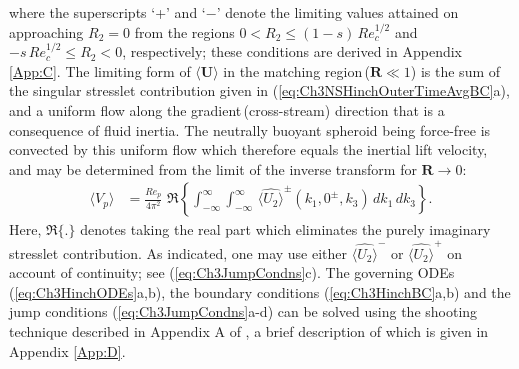 \documentclass{jfm}
\begin{document}
where the superscripts `+' and `$-$' denote the limiting values attained on approaching $R_2 = 0$ from the regions $0<R_2\leq(1-s)\,Re_c^{1/2}$ and $-s\,Re_c^{1/2}\leq R_2<0$, respectively; these conditions are derived in Appendix \ref{App:C}. The limiting form of $\langle \bm{U} \rangle$ in the matching region\,($\bm{R}\ll 1$) is the sum of the singular stresslet contribution given in (\ref{eq:Ch3NSHinchOuterTimeAvgBC}a), and a uniform flow along the gradient\,(cross-stream) direction that is a consequence of fluid inertia. The neutrally buoyant spheroid being force-free is convected by this uniform flow which therefore equals the inertial lift velocity, and may be determined from the limit of the inverse transform for $\bm{R}\to0$:
\begin{align}
\langle V_p\rangle&=\frac{Re_p}{4\pi^2}\,\,\Re\left\{\int_{-\infty}^\infty\int_{-\infty}^\infty \,\hat{\langle U_2\rangle}^\pm(k_1,0^\pm,k_3)\,dk_1\, dk_3\right\}.
\label{eq:Ch3VpHinchInverseFT}
\end{align}
Here, $\Re\{.\}$ denotes taking the real part which eliminates the purely imaginary stresslet contribution. As indicated, one may use either $\hat{\langle U_2\rangle}^-$ or $\hat{\langle U_2\rangle}^+$ on account of continuity; see (\ref{eq:Ch3JumpCondns}c). The governing ODEs (\ref{eq:Ch3HinchODEs}a,b), the boundary conditions (\ref{eq:Ch3HinchBC}a,b) and the jump conditions (\ref{eq:Ch3JumpCondns}a-d) can be solved using the shooting technique described in Appendix A of \cite{schmid2002stability}, a brief description of which is given in Appendix \ref{App:D}. 
\end{document}
